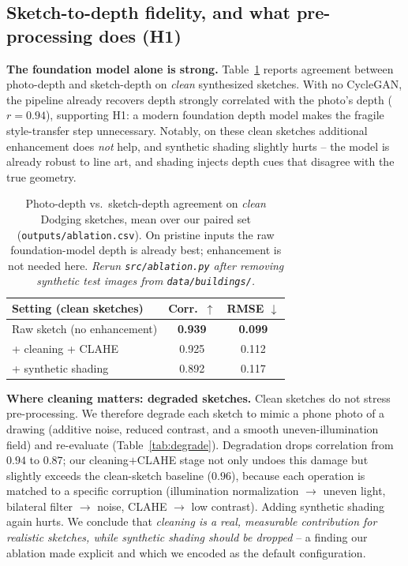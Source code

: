 \documentclass[10pt,twocolumn,letterpaper]{article}
\begin{document}
\subsection{Sketch-to-depth fidelity, and what pre-processing does (H1)}
\label{sec:abl}
\textbf{The foundation model alone is strong.}
Table~\ref{tab:pairs} reports agreement between photo-depth and sketch-depth
on \emph{clean} synthesized sketches. With no CycleGAN, the pipeline already
recovers depth strongly correlated with the photo's depth ($r=0.94$),
supporting H1: a modern foundation depth model makes the fragile
style-transfer step unnecessary. Notably, on these clean sketches additional
enhancement does \emph{not} help, and synthetic shading slightly hurts --
the model is already robust to line art, and shading injects depth cues that
disagree with the true geometry.

\begin{table}[t]
  \centering
  \begin{tabular}{lcc}
    \toprule
    Setting (clean sketches) & Corr.\ $\uparrow$ & RMSE $\downarrow$ \\
    \midrule
    Raw sketch (no enhancement)        & \textbf{0.939} & \textbf{0.099} \\
    + cleaning + CLAHE                 & 0.925 & 0.112 \\
    + synthetic shading                & 0.892 & 0.117 \\
    \bottomrule
  \end{tabular}
  \caption{Photo-depth vs.\ sketch-depth agreement on \emph{clean} Dodging
  sketches, mean over our paired set (\texttt{outputs/ablation.csv}). On
  pristine inputs the raw foundation-model depth is already best; enhancement
  is not needed here. \emph{Rerun \texttt{src/ablation.py} after removing
  synthetic test images from \texttt{data/buildings/}.}}
  \label{tab:pairs}
\end{table}

\textbf{Where cleaning matters: degraded sketches.}
Clean sketches do not stress pre-processing. We therefore degrade each
sketch to mimic a phone photo of a drawing (additive noise, reduced
contrast, and a smooth uneven-illumination field) and re-evaluate
(Table~\ref{tab:degrade}). Degradation drops correlation from $0.94$ to
$0.87$; our cleaning$+$CLAHE stage not only undoes this damage but slightly
exceeds the clean-sketch baseline ($0.96$), because each operation is matched
to a specific corruption (illumination normalization $\rightarrow$ uneven
light, bilateral filter $\rightarrow$ noise, CLAHE $\rightarrow$ low
contrast). Adding synthetic shading again hurts. We conclude that \emph{cleaning is a real,
measurable contribution for realistic sketches, while synthetic shading
should be dropped} -- a finding our ablation made explicit and which we
encoded as the default configuration.
\end{document}
